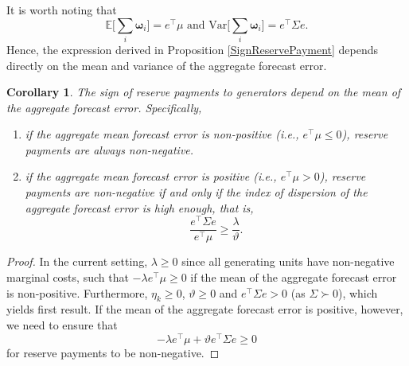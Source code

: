 \documentclass{article}
\newtheorem{corollary}{Corollary}
\begin{document}
It is worth noting that 
\begin{equation*}
\mathbb{E}\Big[\sum_i \boldsymbol{\omega}_i\Big] = e^\top \mu \mbox{ and } \mbox{Var}\Big[\sum_i \boldsymbol{\omega}_i\Big] = e^\top \Sigma e.
\end{equation*}
Hence, the expression derived in Proposition \ref{SignReservePayment} depends directly on the mean and variance of the aggregate forecast error.
\begin{corollary}
The sign of reserve payments to generators depend on the mean of the aggregate forecast error. Specifically, 
\begin{enumerate}
\item if the aggregate mean forecast error is non-positive (i.e., $e^\top \mu \le 0$), reserve payments are always non-negative.
\item if the aggregate mean forecast error is positive (i.e., $e^\top \mu > 0$), reserve payments are non-negative if and only if the index of dispersion of the aggregate forecast error is high enough, that is,
\begin{equation*}
\frac{e^\top \Sigma e}{e^\top \mu} \ge \frac{\lambda}{\vartheta}.
\end{equation*}
\end{enumerate}
\end{corollary}
\begin{proof}
In the current setting, $\lambda \ge 0$ since all generating units have non-negative marginal costs, such that $-\lambda e^\top \mu \ge 0$ if the mean of the aggregate forecast error is non-positive. Furthermore, $\eta_k \ge 0$, $\vartheta \ge 0$ and $e^\top \Sigma e > 0$ (as $\Sigma \succ 0$), which yields first result. If the mean of the aggregate forecast error is positive, however, we need to ensure that
\begin{equation*}
- \lambda e^\top \mu + \vartheta e^\top \Sigma e \ge 0
\end{equation*}
for reserve payments to be non-negative.
\end{proof}

\end{document}
